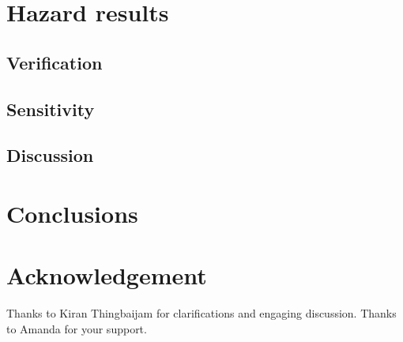 \documentclass{article}
\begin{document}
\section{Hazard results}
\label{sec:Results}

\subsection{Verification}
\label{subsec:Verification}

\subsection{Sensitivity}
\label{subsec:Sensitivity}

\subsection{Discussion}
\label{subsec:Discussion}

\section{Conclusions}
\label{sec:Conclusions}

\section*{Acknowledgement}
Thanks to Kiran Thingbaijam for clarifications and engaging discussion. Thanks to Amanda for your support.

\cleardoublepage
{}
{}


\end{document}
